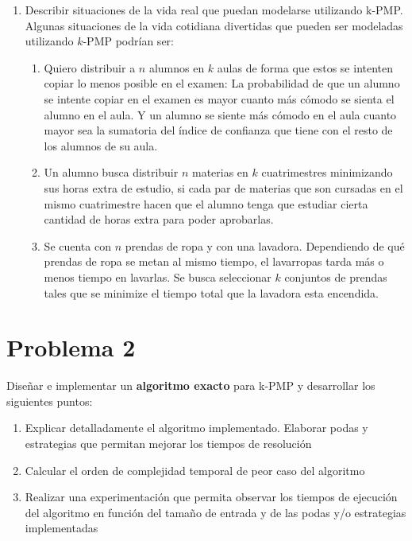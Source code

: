 \documentclass[11pt, a4paper, twoside]{article}
\begin{document}
\begin{enumerate}
		      
			\item Describir situaciones de la vida real que puedan modelarse utilizando k-PMP.
			Algunas situaciones de la vida cotidiana divertidas que pueden ser modeladas utilizando
			$k$-PMP podrían ser:
				  \begin{enumerate}
					\item Quiero distribuir a $n$ alumnos en $k$ aulas de forma que estos se intenten
					copiar lo menos posible en el examen: La probabilidad de que un alumno se intente
					copiar en el examen es mayor cuanto más cómodo se sienta el alumno en el aula. 
					Y un alumno
					se siente más cómodo en el aula cuanto mayor sea la sumatoria del índice de 
					confianza que tiene con el resto de los alumnos de su aula.
					
					\item Un alumno busca distribuir $n$ materias en $k$ cuatrimestres minimizando
					sus horas extra de estudio, si cada par de materias que son cursadas en el mismo
					cuatrimestre hacen que el alumno tenga que estudiar cierta cantidad de horas extra
					para poder aprobarlas.
					
					\item Se cuenta con $n$ prendas de ropa y con una lavadora. Dependiendo de qué prendas
					de ropa se metan al mismo tiempo, el lavarropas tarda más o menos tiempo en lavarlas. Se busca 
					seleccionar $k$ conjuntos de prendas tales que se minimize el tiempo total que la 
					lavadora esta encendida.
				  \end{enumerate}
			\end{enumerate}
	


\newpage
\section{Problema 2}
	Diseñar e implementar un \textbf{algoritmo exacto} para k-PMP y desarrollar los siguientes puntos:
	\begin{enumerate}
	
		\item Explicar detalladamente el algoritmo implementado. Elaborar podas y estrategias que permitan mejorar
		      los tiempos de resolución
		\item Calcular el orden de complejidad temporal de peor caso del algoritmo
		\item Realizar una experimentación que permita observar los tiempos de ejecución del algoritmo en función
		      del tamaño de entrada y de las podas y/o estrategias implementadas
	\end{enumerate}	
			
\end{document}
